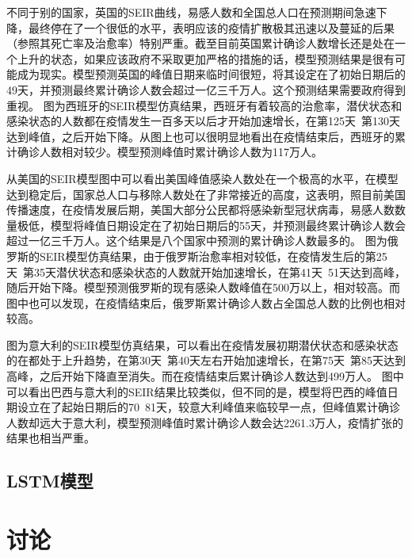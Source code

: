 \documentclass[lang=cn,11pt,a4paper,cite=authoryear]{elegantpaper}
\begin{document}
不同于别的国家，英国的SEIR曲线，易感人数和全国总人口在预测期间急速下降，最终停在了一个很低的水平，表明应该的疫情扩散极其迅速以及蔓延的后果（参照其死亡率及治愈率）特别严重。截至目前英国累计确诊人数增长还是处在一个上升的状态，如果应该政府不采取更加严格的措施的话，模型预测结果是很有可能成为现实。模型预测英国的峰值日期来临时间很短，将其设定在了初始日期后的49天，并预测最终累计确诊人数会超过一亿三千万人。这个预测结果需要政府得到重视。
图为西班牙的SEIR模型仿真结果，西班牙有着较高的治愈率，潜伏状态和感染状态的人数都在疫情发生一百多天以后才开始加速增长，在第125天~第130天达到峰值，之后开始下降。从图上也可以很明显地看出在疫情结束后，西班牙的累计确诊人数相对较少。模型预测峰值时累计确诊人数为117万人。

从美国的SEIR模型图中可以看出美国峰值感染人数处在一个极高的水平，在模型达到稳定后，国家总人口与移除人数处在了非常接近的高度，这表明，照目前美国传播速度，在疫情发展后期，美国大部分公民都将感染新型冠状病毒，易感人数数量极低，模型将峰值日期设定在了初始日期后的55天，并预测最终累计确诊人数会超过一亿三千万人。这个结果是八个国家中预测的累计确诊人数最多的。
图为俄罗斯的SEIR模型仿真结果，由于俄罗斯治愈率相对较低，在疫情发生后的第25天~第35天潜伏状态和感染状态的人数就开始加速增长，在第41天~51天达到高峰，随后开始下降。模型预测俄罗斯的现有感染人数峰值在500万以上，相对较高。而图中也可以发现，在疫情结束后，俄罗斯累计确诊人数占全国总人数的比例也相对较高。

图为意大利的SEIR模型仿真结果，可以看出在疫情发展初期潜伏状态和感染状态的在都处于上升趋势，在第30天~第40天左右开始加速增长，在第75天~第85天达到高峰，之后开始下降直至消失。而在疫情结束后累计确诊人数达到499万人。
图中可以看出巴西与意大利的SEIR结果比较类似，但不同的是，模型将巴西的峰值日期设立在了起始日期后的70~81天，较意大利峰值来临较早一点，但峰值累计确诊人数却远大于意大利，模型预测峰值时累计确诊人数会达2261.3万人，疫情扩张的结果也相当严重。


\subsection{LSTM模型}

\section{讨论}


\end{document}
